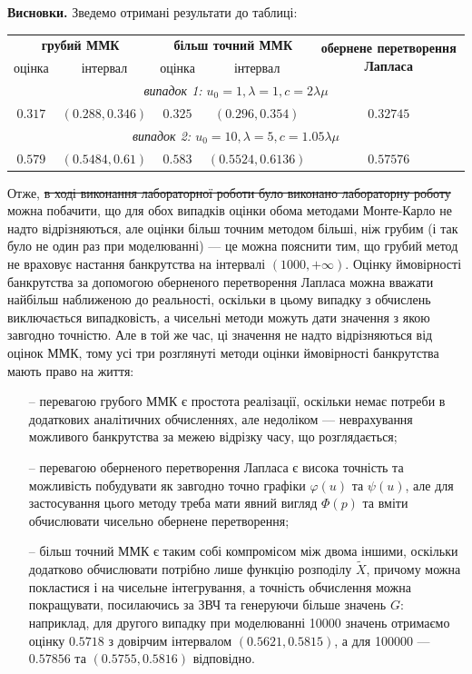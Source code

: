 \documentclass{extreport}
\newcommand{\task}[1]{\vspace{0.5em}\noindent\textbf{#1.}}
\begin{document}
\task{Висновки} Зведемо отримані результати до таблиці:
\begin{center}
    \begin{tabular}{|c|c|c|c|c|}
        \hline
        \multicolumn{2}{|c}{\textbf{грубий ММК}} & \multicolumn{2}{|c|}{\textbf{більш точний ММК}} & \multirow{2}{*}{\textbf{обернене перетворення Лапласа}} \\
        \cline{1-4}
        оцінка & інтервал & оцінка & інтервал & \\
        \hline
        \multicolumn{5}{|c|}{\emph{випадок 1: $u_0 = 1, \lambda = 1, c = 2 \lambda \mu$}} \\
        \hline
        $0.317$ & $(0.288, 0.346)$ & $0.325$ & $(0.296, 0.354)$ & $0.32745$ \\ 
        \hline
        \multicolumn{5}{|c|}{\emph{випадок 2: $u_0 = 10, \lambda = 5, c = 1.05 \lambda \mu$}} \\
        \hline
        $0.579$ & $(0.5484, 0.61)$ & $0.583$ & $(0.5524, 0.6136)$ & $0.57576$ \\ 
        \hline
    \end{tabular}
\end{center}
Отже, \sout{в ході виконання лабораторної роботи було виконано лабораторну роботу} можна побачити,
що для обох випадків оцінки обома методами Монте-Карло не надто відрізняються, але оцінки більш точним методом більші,
ніж грубим (і так було не один раз при моделюванні) --- це можна пояснити тим, що грубий метод не враховує настання банкрутства на 
інтервалі $\left(1000, +\infty\right)$. Оцінку ймовірності банкрутства за допомогою оберненого перетворення Лапласа можна вважати найбільш наближеною до реальності,
оскільки в цьому випадку з обчислень виключається випадковість, а чисельні методи можуть дати значення з якою завгодно точністю.
Але в той же час, ці значення не надто відрізняються від оцінок ММК, тому усі три розглянуті методи оцінки ймовірності банкрутства мають право на життя:
\begin{enumerate}
    \item[--] перевагою грубого ММК є простота реалізації, оскільки немає потреби в додаткових аналітичних обчисленнях, але недоліком ---
    неврахування можливого банкрутства за межею відрізку часу, що розглядається;
    \item[--] перевагою оберненого перетворення Лапласа є висока точність та можливість побудувати як завгодно точно графіки $\varphi(u)$ та $\psi(u)$,
    але для застосування цього методу треба мати явний вигляд $\Phi(p)$ та вміти обчислювати чисельно обернене перетворення;
    \item[--] більш точний ММК є таким собі компромісом між двома іншими, оскільки додатково обчислювати потрібно лише функцію розподілу $\tilde{X}$,
    причому можна покластися і на чисельне інтегрування, а точність обчислення можна покращувати, посилаючись за ЗВЧ та генеруючи більше значень $G$: 
    наприклад, для другого випадку при моделюванні 10000 значень отримаємо оцінку $0.5718$ з довірчим інтервалом $(0.5621, 0.5815)$,
    а для 100000 --- $0.57856$ та $(0.5755, 0.5816)$ відповідно.
\end{enumerate}
\end{document}
